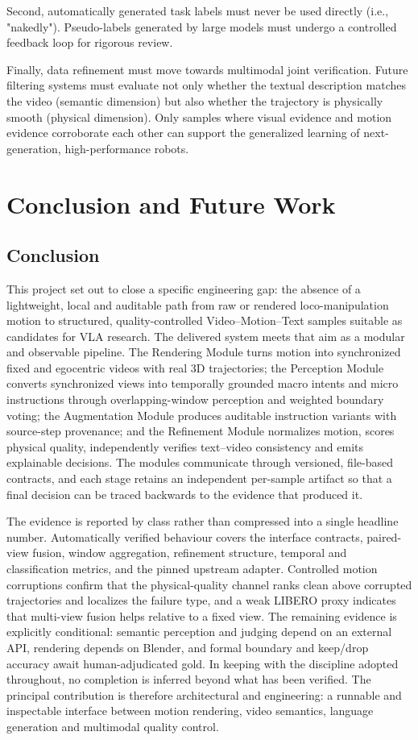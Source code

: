 \documentclass[11pt,oneside]{report}
\begin{document}
Second, automatically generated task labels must never be used directly (i.e., "nakedly"). Pseudo-labels generated by large models must undergo a controlled feedback loop for rigorous review.

Finally, data refinement must move towards multimodal joint verification. Future filtering systems must evaluate not only whether the textual description matches the video (semantic dimension) but also whether the trajectory is physically smooth (physical dimension). Only samples where visual evidence and motion evidence corroborate each other can support the generalized learning of next-generation, high-performance robots.

\chapter{Conclusion and Future Work}
\section{Conclusion}
This project set out to close a specific engineering gap: the absence of a
lightweight, local and auditable path from raw or rendered loco-manipulation
motion to structured, quality-controlled Video--Motion--Text samples suitable as
candidates for VLA research. The delivered system meets that aim as a modular and
observable pipeline. The Rendering Module turns motion into synchronized fixed
and egocentric videos with real 3D trajectories; the Perception Module converts
synchronized views into temporally grounded macro intents and micro instructions
through overlapping-window perception and weighted boundary voting; the
Augmentation Module produces auditable instruction variants with source-step
provenance; and the Refinement Module normalizes motion, scores physical quality,
independently verifies text--video consistency and emits explainable decisions.
The modules communicate through versioned, file-based contracts, and each stage
retains an independent per-sample artifact so that a final decision can be traced
backwards to the evidence that produced it.

The evidence is reported by class rather than compressed into a single headline
number. Automatically verified behaviour covers the interface contracts,
paired-view fusion, window aggregation, refinement structure, temporal and
classification metrics, and the pinned upstream adapter. Controlled motion
corruptions confirm that the physical-quality channel ranks clean above corrupted
trajectories and localizes the failure type, and a weak LIBERO proxy indicates
that multi-view fusion helps relative to a fixed view. The remaining evidence is
explicitly conditional: semantic perception and judging depend on an external
API, rendering depends on Blender, and formal boundary and keep/drop accuracy
await human-adjudicated gold. In keeping with the discipline adopted throughout,
no completion is inferred beyond what has been verified. The principal
contribution is therefore architectural and engineering: a runnable and
inspectable interface between motion rendering, video semantics, language
generation and multimodal quality control.
\end{document}
